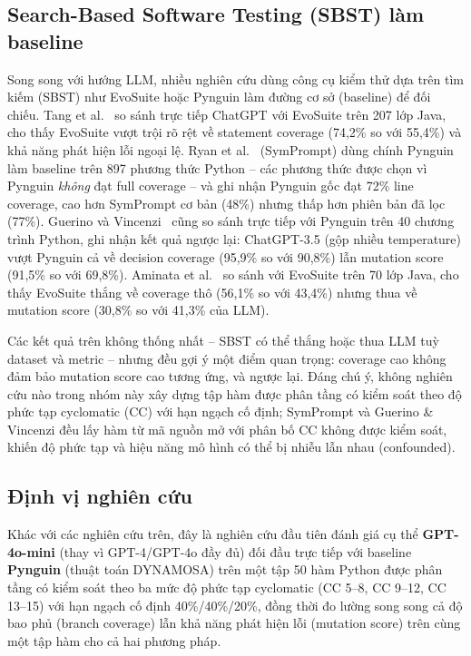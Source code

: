 \subsection{Search-Based Software Testing (SBST) làm baseline}
\label{subsec:related-sbst}

Song song với hướng LLM, nhiều nghiên cứu dùng công cụ kiểm thử dựa trên tìm kiếm (SBST) như EvoSuite hoặc Pynguin làm đường cơ sở (baseline) để đối chiếu. Tang et al.~\cite{tang2024chatgptsbst} so sánh trực tiếp ChatGPT với EvoSuite trên 207 lớp Java, cho thấy EvoSuite vượt trội rõ rệt về statement coverage (74,2\% so với 55,4\%) và khả năng phát hiện lỗi ngoại lệ. Ryan et al.~\cite{ryan2024symprompt} (SymPrompt) dùng chính Pynguin làm baseline trên 897 phương thức Python -- các phương thức được chọn vì Pynguin \emph{không} đạt full coverage -- và ghi nhận Pynguin gốc đạt 72\% line coverage, cao hơn SymPrompt cơ bản (48\%) nhưng thấp hơn phiên bản đã lọc (77\%). Guerino và Vincenzi~\cite{guerino2025chatgptpython} cũng so sánh trực tiếp với Pynguin trên 40 chương trình Python, ghi nhận kết quả ngược lại: ChatGPT-3.5 (gộp nhiều temperature) vượt Pynguin cả về decision coverage (95,9\% so với 90,8\%) lẫn mutation score (91,5\% so với 69,8\%). Aminata et al.~\cite{aminata20252szsp} so sánh với EvoSuite trên 70 lớp Java, cho thấy EvoSuite thắng về coverage thô (56,1\% so với 43,4\%) nhưng thua về mutation score (30,8\% so với 41,3\% của LLM).

Các kết quả trên không thống nhất -- SBST có thể thắng hoặc thua LLM tuỳ dataset và metric -- nhưng đều gợi ý một điểm quan trọng: coverage cao không đảm bảo mutation score cao tương ứng, và ngược lại. Đáng chú ý, không nghiên cứu nào trong nhóm này xây dựng tập hàm được phân tầng có kiểm soát theo độ phức tạp cyclomatic (CC) với hạn ngạch cố định; SymPrompt và Guerino \& Vincenzi đều lấy hàm từ mã nguồn mở với phân bố CC không được kiểm soát, khiến độ phức tạp và hiệu năng mô hình có thể bị nhiễu lẫn nhau (confounded).

\subsection{Định vị nghiên cứu}
\label{subsec:related-positioning}

Khác với các nghiên cứu trên, đây là nghiên cứu đầu tiên đánh giá cụ thể \textbf{GPT-4o-mini} (thay vì GPT-4/GPT-4o đầy đủ) đối đầu trực tiếp với baseline \textbf{Pynguin} (thuật toán DYNAMOSA) trên một tập 50 hàm Python được phân tầng có kiểm soát theo ba mức độ phức tạp cyclomatic (CC 5--8, CC 9--12, CC 13--15) với hạn ngạch cố định 40\%/40\%/20\%, đồng thời đo lường song song cả độ bao phủ (branch coverage) lẫn khả năng phát hiện lỗi (mutation score) trên cùng một tập hàm cho cả hai phương pháp.
